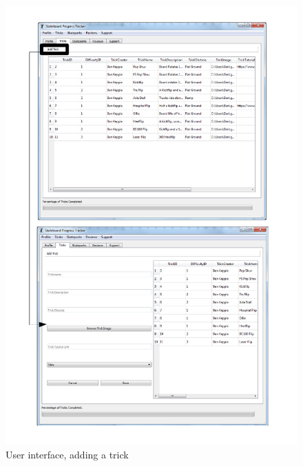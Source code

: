 \begin{figure}[H]
    \includegraphics[width=\textwidth]{./Maintenance/Figures/AddTrick.pdf}
    \caption{User interface, adding a trick} \label{fig:Add Trick UI}
\end{figure}



